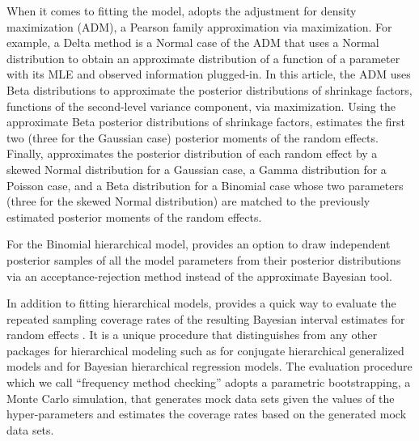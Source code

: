 \documentclass[article]{jss}
\begin{document}
When it comes to fitting the model,  adopts the adjustment for density maximization \citep{carl1988, morris1997, tang2011} (ADM), a Pearson family approximation via maximization. For example, a Delta method is a Normal case of the ADM that uses a Normal distribution to obtain an approximate distribution of a function of a parameter with its MLE and observed information plugged-in. In this article, the ADM uses Beta distributions to approximate the posterior distributions of shrinkage factors, functions of the second-level variance component, via maximization.  Using the approximate Beta posterior distributions of shrinkage factors,  estimates the first two (three for the Gaussian case) posterior moments of the random effects. Finally,  approximates the posterior distribution of each random effect by a skewed Normal distribution for a Gaussian case, a Gamma distribution for a Poisson case, and a Beta distribution for a Binomial case whose two parameters (three for the skewed Normal distribution) are matched to the previously estimated posterior moments of the random effects. 


For the Binomial  hierarchical model,  provides an option to draw independent posterior samples of all the model parameters from their posterior distributions via an acceptance-rejection method instead of the approximate Bayesian tool.


In addition to fitting hierarchical models,  provides a quick way to evaluate the repeated sampling coverage rates of the resulting Bayesian interval estimates for random effects \citep{morris1997, daniels1999prior, tang2002fitting, tang2011, morris2012}. It is a unique procedure that distinguishes   from any other  packages for hierarchical modeling such as  \citep{hglm2010, ronnegaard2011hglm} for conjugate hierarchical generalized models and  \citep{gelman2014arm} for Bayesian hierarchical regression models. The evaluation procedure which we call ``frequency method checking'' adopts a parametric bootstrapping, a Monte Carlo simulation, that generates mock data sets given the values of the hyper-parameters and estimates the coverage rates based on the generated mock data sets.
\end{document}
